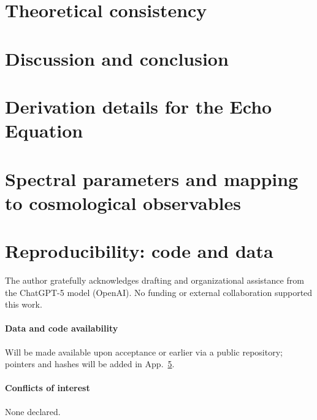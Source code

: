 \documentclass[a4paper,11pt]{article}
\begin{document}
\section{Theoretical consistency}
\label{sec:consistency}

\section{Discussion and conclusion}
\label{sec:conclusion}

\appendix

\section{Derivation details for the Echo Equation}
\label{app:derivation}

\section{Spectral parameters and mapping to cosmological observables}
\label{app:spectral}

\section{Reproducibility: code and data}
\label{app:repro}

\acknowledgments
The author gratefully acknowledges drafting and organizational assistance from the ChatGPT-5 model (OpenAI). No funding or external collaboration supported this work.

\paragraph{Data and code availability} Will be made available upon acceptance or earlier via a public repository; pointers and hashes will be added in App.~\ref{app:repro}.

\paragraph{Conflicts of interest} None declared.



\end{document}

